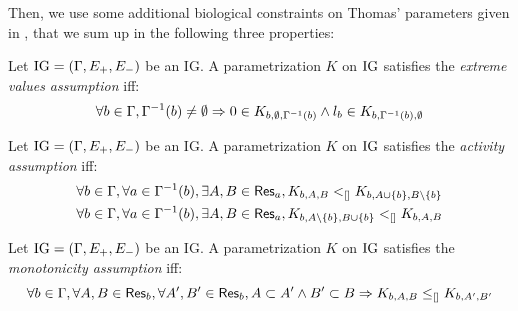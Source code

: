 Then, we use some additional biological constraints on Thomas' parameters given in
\cite{BernotSemBRN}, that we sum up in the following three properties:

\begin{property}
Let $\mathrm{IG} = (\Gamma, E_+, E_-)$ be an IG. A parametrization $K$ on $\mathrm{IG}$ satisfies the \emph{extreme values assumption} iff:
\label{prop:param_enum_extreme}
\[
  \forall b \in \Gamma, \Gamma^{-1}(b) \neq \emptyset \Rightarrow 0 \in K_{b,\emptyset,\Gamma^{-1}(b)} \wedge l_b \in K_{b,\Gamma^{-1}(b),\emptyset}
\]
\end{property}

\begin{property}
\label{prop:param_enum_activity}
Let $\mathrm{IG} = (\Gamma, E_+, E_-)$ be an IG. A parametrization $K$ on $\mathrm{IG}$ satisfies the \emph{activity assumption} iff:
\begin{align*}
  \forall b \in \Gamma, \forall a \in \Gamma^{-1}(b), \exists A,B \in \mathsf{Res}_{a}, K_{b,A,B} <_{[]} K_{b,A \cup \{b\},B \setminus \{b\}}
\\
  \forall b \in \Gamma, \forall a \in \Gamma^{-1}(b), \exists A,B \in \mathsf{Res}_{a}, K_{b,A \setminus \{b\},B \cup \{b\}} <_{[]} K_{b,A,B}
\end{align*}
\end{property}

\begin{property}
\label{prop:param_enum_monotonicity}
Let $\mathrm{IG} = (\Gamma, E_+, E_-)$ be an IG. A parametrization $K$ on $\mathrm{IG}$ satisfies the \emph{monotonicity assumption} iff:
\[
  \forall b \in \Gamma, \forall A,B \in \mathsf{Res}_{b}, \forall A',B' \in \mathsf{Res}_{b},
  A \subset A' \wedge B' \subset B \Rightarrow K_{b,A,B} \leq_{[]} K_{b,A',B'}
\]
\end{property}

\begin{comment}
\begin{definition}[Admissible parametrization \& Admissible parametrization with respect to inferred parameters]
\label{def:param_enum_inf}
Let $\PH = (\PHs, \PHl, \PHh)$ be a PH so that IG inference is possible, and $\IG = (\Gamma, E_+,
E_-)$ the inferred IG.
A parametrization $K$ on $\IG$ is said to be \emph{admissible} iff it respects
the extreme values assumption, the activity assumption and the monotonicity assumption.
A parametrization $K$ on $\IG$ is said to be \emph{admissible with respect to the
inferred parameters} iff it is admissible and that all parameters that can be inferred regarding
\pref{pps:param_K} are equal to their inferred value.
\end{definition}

\todo{utilité de “Admissible parametrization” seul ?}
\end{comment}



